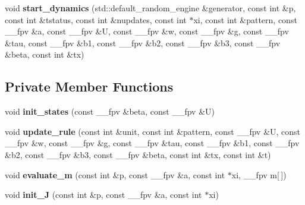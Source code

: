 \begin{DoxyCompactItemize}
\item 
void {\bfseries start\+\_\+dynamics} (std\+::default\+\_\+random\+\_\+engine \&generator, const int \&p, const int \&tstatus, const int \&nupdates, const int $\ast$xi, const int \&pattern, const \+\_\+\+\_\+fpv \&a, const \+\_\+\+\_\+fpv \&U, const \+\_\+\+\_\+fpv \&w, const \+\_\+\+\_\+fpv \&g, const \+\_\+\+\_\+fpv \&tau, const \+\_\+\+\_\+fpv \&b1, const \+\_\+\+\_\+fpv \&b2, const \+\_\+\+\_\+fpv \&b3, const \+\_\+\+\_\+fpv \&beta, const int \&tx)\hypertarget{classHC__PNet_a23cc68c5ef1225dddda2e3b5f11f5d80}{}\label{classHC__PNet_a23cc68c5ef1225dddda2e3b5f11f5d80}

\end{DoxyCompactItemize}
\subsection*{Private Member Functions}
\begin{DoxyCompactItemize}
\item 
void {\bfseries init\+\_\+states} (const \+\_\+\+\_\+fpv \&beta, const \+\_\+\+\_\+fpv \&U)\hypertarget{classHC__PNet_ac0b0fa614dced55cd174a75760c433a6}{}\label{classHC__PNet_ac0b0fa614dced55cd174a75760c433a6}

\item 
void {\bfseries update\+\_\+rule} (const int \&unit, const int \&pattern, const \+\_\+\+\_\+fpv \&U, const \+\_\+\+\_\+fpv \&w, const \+\_\+\+\_\+fpv \&g, const \+\_\+\+\_\+fpv \&tau, const \+\_\+\+\_\+fpv \&b1, const \+\_\+\+\_\+fpv \&b2, const \+\_\+\+\_\+fpv \&b3, const \+\_\+\+\_\+fpv \&beta, const int \&tx, const int \&t)\hypertarget{classHC__PNet_aa52cb9b21bafd7d988a7f436ab374713}{}\label{classHC__PNet_aa52cb9b21bafd7d988a7f436ab374713}

\item 
void {\bfseries evaluate\+\_\+m} (const int \&p, const \+\_\+\+\_\+fpv \&a, const int $\ast$xi, \+\_\+\+\_\+fpv m\mbox{[}$\,$\mbox{]})\hypertarget{classHC__PNet_a98650ec17421ae816d27d897149d511e}{}\label{classHC__PNet_a98650ec17421ae816d27d897149d511e}

\item 
void {\bfseries init\+\_\+J} (const int \&p, const \+\_\+\+\_\+fpv \&a, const int $\ast$xi)\hypertarget{classHC__PNet_a44f9724a29ab7c518438dc3c15c59204}{}\label{classHC__PNet_a44f9724a29ab7c518438dc3c15c59204}

\end{DoxyCompactItemize}
